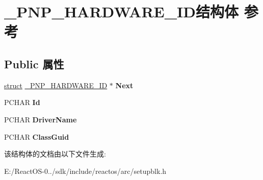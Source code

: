 \hypertarget{struct___p_n_p___h_a_r_d_w_a_r_e___i_d}{}\section{\+\_\+\+P\+N\+P\+\_\+\+H\+A\+R\+D\+W\+A\+R\+E\+\_\+\+I\+D结构体 参考}
\label{struct___p_n_p___h_a_r_d_w_a_r_e___i_d}
\subsection*{Public 属性}
\begin{DoxyCompactItemize}
\item 
\mbox{\label{struct___p_n_p___h_a_r_d_w_a_r_e___i_d_abb07e41b373f7fd810f59fc3a7f83c2b}} 
\hyperlink{interfacestruct}{struct} \hyperlink{struct___p_n_p___h_a_r_d_w_a_r_e___i_d}{\+\_\+\+P\+N\+P\+\_\+\+H\+A\+R\+D\+W\+A\+R\+E\+\_\+\+ID} $\ast$ {\bfseries Next}
\item 
\mbox{\label{struct___p_n_p___h_a_r_d_w_a_r_e___i_d_a8660a96a0f3e2a1106c0bbf1f7daccc8}} 
P\+C\+H\+AR {\bfseries Id}
\item 
\mbox{\label{struct___p_n_p___h_a_r_d_w_a_r_e___i_d_a75cb1be2cf74e7529cec79bc75d7ab2b}} 
P\+C\+H\+AR {\bfseries Driver\+Name}
\item 
\mbox{\label{struct___p_n_p___h_a_r_d_w_a_r_e___i_d_a535afbe2d1c02d8849e00cd4b1f4cb85}} 
P\+C\+H\+AR {\bfseries Class\+Guid}
\end{DoxyCompactItemize}


该结构体的文档由以下文件生成\+:\begin{DoxyCompactItemize}
\item 
E\+:/\+React\+O\+S-\/0../sdk/include/reactos/arc/setupblk.\+h\end{DoxyCompactItemize}

